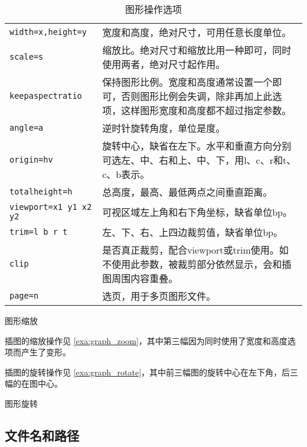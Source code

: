 \begin{table}[htbp]
\caption{图形操作选项}
\label{tab:graph_options}
\centering
\begin{tabularx}{\textwidth}{lX}
    \toprule
    \texttt{width=x,height=y} & 宽度和高度，绝对尺寸，可用任意长度单位。\\
    \texttt{scale=s} & 缩放比。绝对尺寸和缩放比用一种即可，同时使用两者，绝对尺寸起作用。\\
    \texttt{keepaspectratio} & 保持图形比例。宽度和高度通常设置一个即可，否则图形比例会失调，除非再加上此选项，这样图形宽度和高度都不超过指定参数。\\
    \texttt{angle=a} & 逆时针旋转角度，单位是度。\\
    \texttt{origin=hv} & 旋转中心，缺省在左下。水平和垂直方向分别可选左、中、右和上、中、下，用l、c、r和t、c、b表示。\\
    \texttt{totalheight=h} & 总高度，最高、最低两点之间垂直距离。\\
    \texttt{viewport=x1 y1 x2 y2} & 可视区域左上角和右下角坐标，缺省单位bp。\\
    \texttt{trim=l b r t} & 左、下、右、上四边裁剪值，缺省单位bp。\\
    \texttt{clip} & 是否真正裁剪，配合viewport或trim使用。如不使用此参数，被裁剪部分依然显示，会和插图周围内容重叠。\\
    \texttt{page=n} & 选页，用于多页图形文件。\\
    \bottomrule
\end{tabularx}
\end{table}

\begin{example}[!htbp]
\caption{图形缩放}
\label{exa:graph_zoom}
\end{example}

插图的缩放操作见 \autoref{exa:graph_zoom}，其中第三幅因为同时使用了宽度和高度选项而产生了变形。

插图的旋转操作见 \autoref{exa:graph_rotate}，其中前三幅图的旋转中心在左下角，后三幅的在图中心。

\begin{example}[htbp]
\caption{图形旋转}
\label{exa:graph_rotate}
\end{example}

\subsection{文件名和路径}

